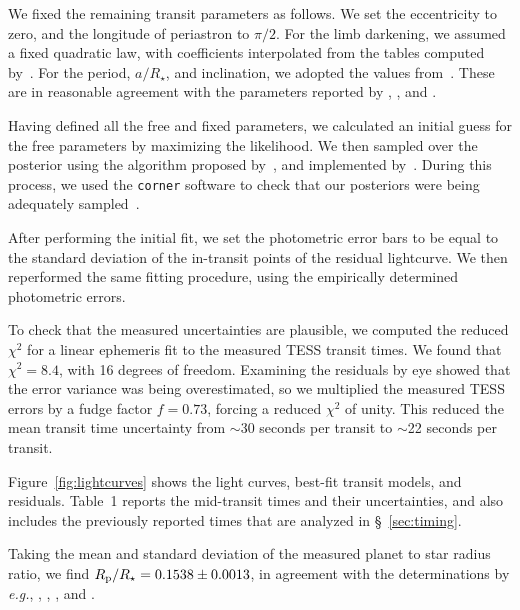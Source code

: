 \documentclass[12pt,twocolumn,tighten]{aastex62}
\begin{document}
We fixed the remaining transit parameters as follows.  We set the
eccentricity to zero, and the longitude of periastron to $\pi/2$.  For
the limb darkening, we assumed a fixed quadratic law, with
coefficients interpolated from the tables computed
by~\citet{claret_limb_2017}.  For the period, $a/R_\star$, and
inclination, we adopted the values from~\citet{petrucci_no_2013}.
These are in reasonable agreement with the parameters reported by
\citet{gillon_improved_2009}, \citet{southworth_high-precision_2009},
and \citet{huitson_gemini_2017}.

Having defined all the free and fixed parameters, we calculated an
initial guess for the free parameters by maximizing the likelihood.
We then sampled over the posterior using the algorithm proposed
by~\citet{goodman_ensemble_2010}, and implemented
by~\citet{foreman-mackey_emcee_2013}.  During this process, we used
the \texttt{corner} software to check that our posteriors were being
adequately sampled~\citep{corner_2016}.

After performing the initial fit, we set the photometric error bars to
be equal to the standard deviation of the in-transit points of the
residual lightcurve.  We then reperformed the same fitting procedure,
using the empirically determined photometric errors.

To check that the measured uncertainties are plausible, we computed
the reduced $\chi^2$ for a linear ephemeris fit to the measured TESS
transit times.  We found that $\chi^2 = 8.4$, with 16 degrees of
freedom.  Examining the residuals by eye showed that the error
variance was being overestimated, so we multiplied the measured TESS
errors by a fudge factor $f=0.73$, forcing a reduced $\chi^2$ of
unity.  This reduced the mean transit time uncertainty from $\sim$30
seconds per transit to $\sim$22 seconds per transit.

Figure~\ref{fig:lightcurves} shows the light curves, best-fit
transit models, and residuals.
Table~1 reports the mid-transit times and
their uncertainties, and also includes the
previously reported times that are analyzed in
\S~\ref{sec:timing}.

Taking the mean and standard deviation of the measured planet to star
radius ratio, we find $R_{\rm p}/R_\star=0.1538\pm0.0013$, in
agreement with the determinations by {\it e.g.},
\citet{wilson_wasp-4b_2008}, \citet{gillon_improved_2009},
\citet{winn_transit_2009}, and \citet{southworth_high-precision_2009}.
\end{document}
